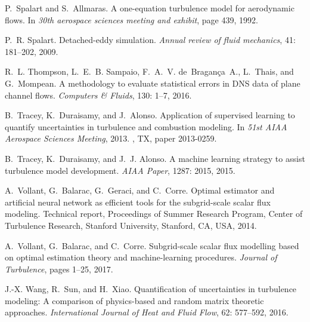 \documentclass[a4paper]{ar-1col}
\begin{document}
\begin{thebibliography}{82}
P.~Spalart and S.~Allmaras.
\newblock A one-equation turbulence model for aerodynamic flows.
\newblock In \emph{30th aerospace sciences meeting and exhibit}, page 439,
  1992.

P.~R. Spalart.
\newblock Detached-eddy simulation.
\newblock \emph{Annual review of fluid mechanics}, 41: 181--202, 2009.

R.~L. Thompson, L.~E.~B. Sampaio, F.~A.~V. de~Bragan{\c{c}}a~A., L.~Thais, and
  G.~Mompean.
\newblock A methodology to evaluate statistical errors in {DNS} data of plane
  channel flows.
\newblock \emph{Computers \& Fluids}, 130: 1--7, 2016.

B.~Tracey, K.~Duraisamy, and J.~Alonso.
\newblock Application of supervised learning to quantify uncertainties in
  turbulence and combustion modeling.
\newblock In \emph{51st AIAA Aerospace Sciences Meeting}, 2013.
, TX, paper 2013-0259.

B.~Tracey, K.~Duraisamy, and J.~J. Alonso.
\newblock A machine learning strategy to assist turbulence model development.
\newblock \emph{AIAA Paper}, 1287: 2015, 2015.

A.~Vollant, G.~Balarac, G.~Geraci, and C.~Corre.
\newblock Optimal estimator and artificial neural network as efficient tools
  for the subgrid-scale scalar flux modeling.
\newblock Technical report, Proceedings of Summer Research Program, Center of
  Turbulence Research, Stanford University, Stanford, CA, USA, 2014.

A.~Vollant, G.~Balarac, and C.~Corre.
\newblock Subgrid-scale scalar flux modelling based on optimal estimation
  theory and machine-learning procedures.
\newblock \emph{Journal of Turbulence}, pages 1--25, 2017.

J.-X. Wang, R.~Sun, and H.~Xiao.
\newblock Quantification of uncertainties in turbulence modeling: A comparison
  of physics-based and random matrix theoretic approaches.
\newblock \emph{International Journal of Heat and Fluid Flow}, 62:
  577--592, 2016{}.


\end{thebibliography}
\end{document}
